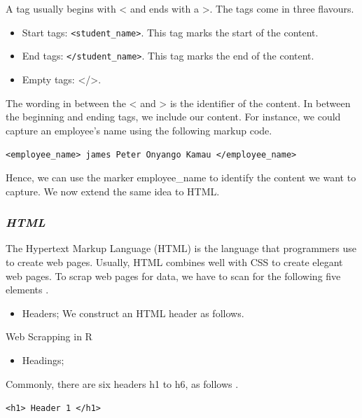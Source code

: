 \documentclass[]{tufte-handout}
\providecommand{\tightlist}{%
  \setlength{\itemsep}{0pt}\setlength{\parskip}{0pt}}
\begin{document}
A tag usually begins with \textless{} and ends with a \textgreater. The
tags come in three flavours.

\begin{itemize}
\item
  Start tags: \texttt{\textless{}student\_name\textgreater{}}. This tag
  marks the start of the content.
\item
  End tags: \texttt{\textless{}/student\_name\textgreater{}}. This tag
  marks the end of the content.
\item
  Empty tags: \textless/\textgreater.
\end{itemize}

The wording in between the \textless{} and \textgreater{} is the
identifier of the content. In between the beginning and ending tags, we
include our content. For instance, we could capture an employee's name
using the following markup code.

\texttt{\textless{}employee\_name\textgreater{}\ james\ Peter\ Onyango\ Kamau\ \textless{}/employee\_name\textgreater{}}

Hence, we can use the marker employee\_name to identify the content we
want to capture. We now extend the same idea to HTML.

\hypertarget{html}{%
\subsubsection{\texorpdfstring{\textbf{\emph{HTML}}}{HTML}}\label{html}}

The Hypertext Markup Language (HTML) is the language that programmers
use to create web pages. Usually, HTML combines well with CSS to create
elegant web pages. To scrap web pages for data, we have to scan for the
following five elements \citep{bradley2019web}.

\begin{itemize}
\tightlist
\item
  Headers; We construct an HTML header as follows.
\end{itemize}

Web Scrapping in R

\begin{itemize}
\tightlist
\item
  Headings;
\end{itemize}

Commonly, there are six headers h1 to h6, as follows
\citep{michaud2013foundations}.

\texttt{\textless{}h1\textgreater{}\ Header\ 1\ \textless{}/h1\textgreater{}}
\end{document}
